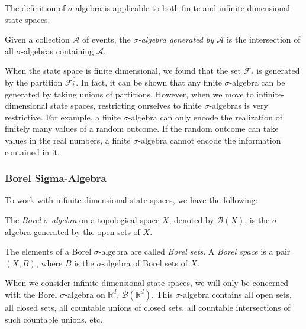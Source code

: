 \documentclass[\topdir/lecture\_notes.tex]{subfiles}
\begin{document}
The definition of \(\sigma\)-algebra is applicable to both finite and infinite-dimensional state spaces.

\begin{defn}
Given a collection \(\mathcal{A}\) of events, the \emph{\(\sigma\)-algebra generated by \(\mathcal{A}\)} is the intersection of all \(\sigma\)-algebras containing \(\mathcal{A}\).
\end{defn}

When the state space is finite dimensional, we found that the set \(\mathcal{F}_{t}\) is generated by the partition \(\mathcal{F}_{t}^{0}\). In fact, it can be shown that any finite \(\sigma\)-algebra can be generated by taking unions of partitions. However, when we move to infinite-dimensional state spaces, restricting ourselves to finite \(\sigma\)-algebras is very restrictive. For example, a finite \(\sigma\)-algebra can only encode the realization of finitely many values of a random outcome. If the random outcome can take values in the real numbers, a finite \(\sigma\)-algebra cannot encode the information contained in it.

\subsubsection{Borel Sigma-Algebra}
To work with infinite-dimensional state spaces, we have the following:
\begin{defn}
The \emph{Borel \(\sigma\)-algebra} on a topological space \(X\), denoted by \(\mathcal{B}(X)\), is the \(\sigma\)-algebra generated by the open sets of \(X\).
\end{defn}
The elements of a Borel \(\sigma\)-algebra are called \emph{Borel sets}. A \emph{Borel space} is a pair \((X,B)\), where \(B\) is the \(\sigma\)-algebra of Borel sets of \(X\).

When we consider infinite-dimensional state spaces, we will only be concerned with the Borel \(\sigma\)-algebra on \(\mathbb{R}^{d}\), \(\mathcal{B}(\mathbb{R}^d)\). This \(\sigma\)-algebra contains all open sets, all closed sets, all countable unions of closed sets, all countable intersections of such countable unions, etc. 
\end{document}

